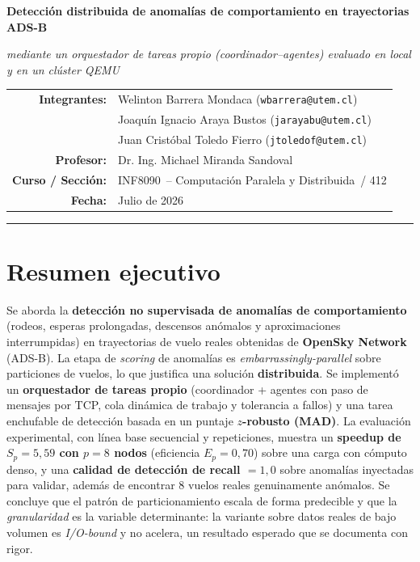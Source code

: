 \documentclass[letterpaper,11pt]{article}
\newcommand{\codcurso}{INF8090}
\newcommand{\nombrecurso}{Computación Paralela y Distribuida}
\newcommand{\profesor}{Dr. Ing. Michael Miranda Sandoval}
\begin{document}
\pagestyle{fancy}
\shorthandoff{<>}   %

\begin{center}
{\Large\bfseries Detección distribuida de anomalías de comportamiento en trayectorias ADS-B\par}
\vspace{0.15cm}
{\large\itshape mediante un orquestador de tareas propio (coordinador--agentes) evaluado en local y en un clúster QEMU\par}
\vspace{0.35cm}
\begin{tabular}{rl}
\textbf{Integrantes:} & Welinton Barrera Mondaca \quad (\texttt{wbarrera@utem.cl}) \\
 & Joaquín Ignacio Araya Bustos \quad (\texttt{jarayabu@utem.cl}) \\
 & Juan Cristóbal Toledo Fierro \quad (\texttt{jtoledof@utem.cl}) \\
\textbf{Profesor:} & \profesor \\
\textbf{Curso / Sección:} & \codcurso\ -- \nombrecurso\ / 412 \\
\textbf{Fecha:} & Julio de 2026 \\
\end{tabular}
\end{center}
\vspace{0.1cm}\hrule\vspace{0.25cm}

\section*{Resumen ejecutivo}
Se aborda la \textbf{detección no supervisada de anomalías de comportamiento} (rodeos, esperas
prolongadas, descensos anómalos y aproximaciones interrumpidas) en trayectorias de vuelo reales
obtenidas de \textbf{OpenSky Network} (ADS-B). La etapa de \emph{scoring} de anomalías es
\emph{embarrassingly-parallel} sobre particiones de vuelos, lo que justifica una solución
\textbf{distribuida}. Se implementó un \textbf{orquestador de tareas propio} (coordinador + agentes con
paso de mensajes por TCP, cola dinámica de trabajo y tolerancia a fallos) y una tarea enchufable de
detección basada en un puntaje \textbf{$z$-robusto (MAD)}. La evaluación experimental, con línea base
secuencial y repeticiones, muestra un \textbf{speedup de $S_p=5{,}59$ con $p=8$ nodos} (eficiencia
$E_p=0{,}70$) sobre una carga con cómputo denso, y una \textbf{calidad de detección de recall $=1{,}0$}
sobre anomalías inyectadas para validar, además de encontrar 8 vuelos reales genuinamente anómalos. Se
concluye que el patrón de particionamiento escala de forma predecible y que la \emph{granularidad} es la
variable determinante: la variante sobre datos reales de bajo volumen es \emph{I/O-bound} y no acelera,
un resultado esperado que se documenta con rigor.
\end{document}
